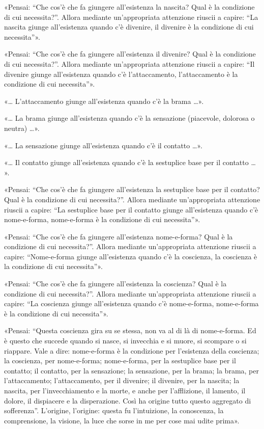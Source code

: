 «Pensai: “Che cos’è che fa giungere all’esistenza la nascita? Qual è la
condizione di cui necessita?”. Allora mediante un’appropriata attenzione riuscii
a capire: “La nascita giunge all’esistenza quando c’è divenire, il divenire è la
condizione di cui necessita”».

«Pensai: “Che cos’è che fa giungere all’esistenza il divenire? Qual è la
condizione di cui necessita?”. Allora mediante un’appropriata attenzione riuscii
a capire: “Il divenire giunge all’esistenza quando c’è l’attaccamento,
l’attaccamento è la condizione di cui necessita”».

«…​ L’attaccamento giunge all’esistenza quando c’è la brama …​».

«…​ La brama giunge all’esistenza quando c’è la sensazione (piacevole, dolorosa o
neutra) …​».

«…​ La sensazione giunge all’esistenza quando c’è il contatto …​».

«…​ Il contatto giunge all’esistenza quando c’è la sestuplice base per il
contatto …​».

«Pensai: “Che cos’è che fa giungere all’esistenza la sestuplice base per il
contatto? Qual è la condizione di cui necessita?”. Allora mediante
un’appropriata attenzione riuscii a capire: “La sestuplice base per il contatto
giunge all’esistenza quando c’è nome-e-forma, nome-e-forma è la condizione di
cui necessita”».

«Pensai: “Che cos’è che fa giungere all’esistenza nome-e-forma? Qual è la
condizione di cui necessita?”. Allora mediante un’appropriata attenzione riuscii
a capire: “Nome-e-forma giunge all’esistenza quando c’è la coscienza, la
coscienza è la condizione di cui necessita”».

«Pensai: “Che cos’è che fa giungere all’esistenza la coscienza? Qual è la
condizione di cui necessita?”. Allora mediante un’appropriata attenzione riuscii
a capire: “La coscienza giunge all’esistenza quando c’è nome-e-forma,
nome-e-forma è la condizione di cui necessita”».

«Pensai: “Questa coscienza gira su se stessa, non va al di là di nome-e-forma.
Ed è questo che succede quando si nasce, si invecchia e si muore, si scompare o
si riappare. Vale a dire: nome-e-forma è la condizione per l’esistenza della
coscienza; la coscienza, per nome-e-forma; nome-e-forma, per la sestuplice base
per il contatto; il contatto, per la sensazione; la sensazione, per la brama; la
brama, per l’attaccamento; l’attaccamento, per il divenire; il divenire, per la
nascita; la nascita, per l’invecchiamento e la morte, e anche per l’afflizione,
il lamento, il dolore, il dispiacere e la disperazione. Così ha origine tutto
questo aggregato di sofferenza”. L’origine, l’origine: questa fu l’intuizione,
la conoscenza, la comprensione, la visione, la luce che sorse in me per cose mai
udite prima».

